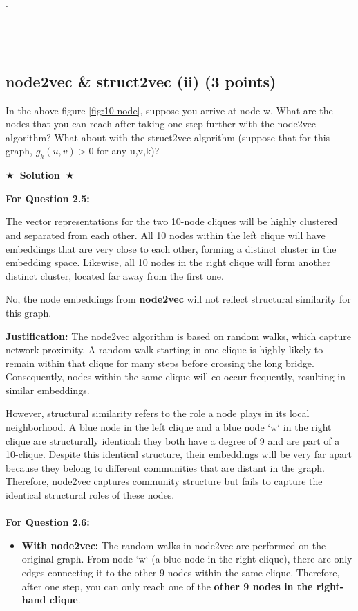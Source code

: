 \documentclass{article}
\numberwithin{figure}{section}
\newcommand{\Solution}[1]{%
	{%
		\medskip
		\color{red}
		\bf $\bigstar$~\sf\textbf{Solution}~$\bigstar$ \sf
		#1
	}
	\bigskip
}
\begin{document}
	.\\\\\\\\
	\subsection{ node2vec \& struct2vec (ii) (3 points)}
	In the above figure \ref{fig:10-node}, suppose you arrive at node w. What are the nodes that you can reach after taking one step further with the node2vec algorithm? What about with the struct2vec algorithm (suppose that for this graph, $g_k(u, v) > 0$ for any u,v,k)?
	
	\Solution{
		\textbf{For Question 2.5:}
		
		The vector representations for the two 10-node cliques will be highly clustered and separated from each other. All 10 nodes within the left clique will have embeddings that are very close to each other, forming a distinct cluster in the embedding space. Likewise, all 10 nodes in the right clique will form another distinct cluster, located far away from the first one.
		
		No, the node embeddings from \textbf{node2vec} will not reflect structural similarity for this graph.
		
		\textbf{Justification:}
		The node2vec algorithm is based on random walks, which capture network proximity. A random walk starting in one clique is highly likely to remain within that clique for many steps before crossing the long bridge. Consequently, nodes within the same clique will co-occur frequently, resulting in similar embeddings.
		
		However, structural similarity refers to the role a node plays in its local neighborhood. A blue node in the left clique and a blue node `w` in the right clique are structurally identical: they both have a degree of 9 and are part of a 10-clique. Despite this identical structure, their embeddings will be very far apart because they belong to different communities that are distant in the graph. Therefore, node2vec captures community structure but fails to capture the identical structural roles of these nodes.
		\\\\
		\textbf{For Question 2.6:}
		
		\begin{itemize}
			\item \textbf{With node2vec:} The random walks in node2vec are performed on the original graph. From node `w` (a blue node in the right clique), there are only edges connecting it to the other 9 nodes within the same clique. Therefore, after one step, you can only reach one of the \textbf{other 9 nodes in the right-hand clique}.
			

\end{itemize}}
\end{document}
